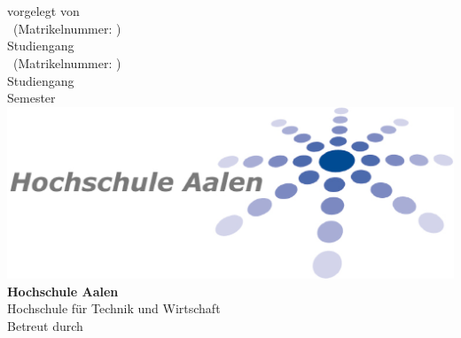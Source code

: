 \begin{titlepage}
    \centering%
    \vspace*{\fill}%
    \linespread{1.2}
    \sffamily
    \textbf{\huge{\Course}}\\[1.2cm]
    \large{\textbf{\Subject}}\\[1.2cm]
    vorgelegt von\\[1.2cm]
    \Author\ (Matrikelnummer: \Matriculation)\\
    Studiengang \Discipline\\[1.0cm]
    \AuthorZwei\ (Matrikelnummer: \MatriculationZwei)\\
    Studiengang \DisciplineZwei\\[1.0cm]
    Semester \Semester\\[0.2cm]
    \includegraphics[scale=0.3]{Bilder/htw}\\[0.1cm]
    \textbf{Hochschule Aalen}\\[0.2cm]
    Hochschule für Technik und Wirtschaft\\[0.2cm]
    Betreut durch \Professor\\[0.2cm]
    \Deadline%
    \vspace*{\fill}%
\end{titlepage}
\restoregeometry%
